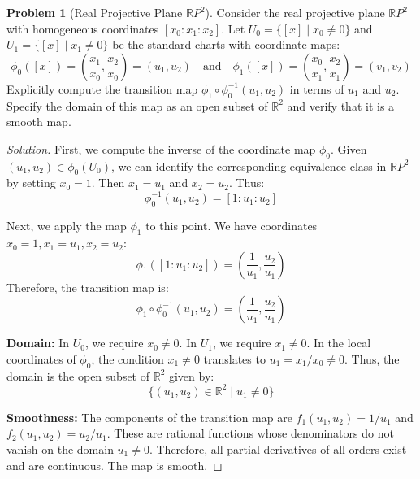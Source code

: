 \documentclass[12pt, a4paper]{article}
\theoremstyle{definition}
\newtheorem{problem}{Problem}
\newenvironment{solution}
  {\renewcommand\qedsymbol{$\blacksquare$}\begin{proof}[Solution]}
  {\end{proof}}
\newcommand{\RR}{\mathbb{R}}
\begin{document}
\begin{problem}[Real Projective Plane $\RR P^2$]
Consider the real projective plane $\RR P^2$ with homogeneous coordinates $[x_0 : x_1 : x_2]$. Let $U_0 = \{ [x] \mid x_0 \neq 0 \}$ and $U_1 = \{ [x] \mid x_1 \neq 0 \}$ be the standard charts with coordinate maps:
$$\phi_0([x]) = \left(\frac{x_1}{x_0}, \frac{x_2}{x_0}\right) = (u_1, u_2) \quad \text{and} \quad \phi_1([x]) = \left(\frac{x_0}{x_1}, \frac{x_2}{x_1}\right) = (v_1, v_2)$$
Explicitly compute the transition map $\phi_1 \circ \phi_0^{-1}(u_1, u_2)$ in terms of $u_1$ and $u_2$. Specify the domain of this map as an open subset of $\RR^2$ and verify that it is a smooth map.
\end{problem}
\begin{solution}
First, we compute the inverse of the coordinate map $\phi_0$. Given $(u_1, u_2) \in \phi_0(U_0)$, we can identify the corresponding equivalence class in $\RR P^2$ by setting $x_0 = 1$. Then $x_1 = u_1$ and $x_2 = u_2$. Thus:
\[
\phi_0^{-1}(u_1, u_2) = [1 : u_1 : u_2]
\]

Next, we apply the map $\phi_1$ to this point. We have coordinates $x_0 = 1, x_1 = u_1, x_2 = u_2$:
\[
\phi_1([1 : u_1 : u_2]) = \left( \frac{1}{u_1}, \frac{u_2}{u_1} \right)
\]
Therefore, the transition map is:
\[
\phi_1 \circ \phi_0^{-1}(u_1, u_2) = \left( \frac{1}{u_1}, \frac{u_2}{u_1} \right)
\]

\textbf{Domain:} In $U_0$, we require $x_0 \neq 0$. In $U_1$, we require $x_1 \neq 0$. In the local coordinates of $\phi_0$, the condition $x_1 \neq 0$ translates to $u_1 = x_1/x_0 \neq 0$. 
Thus, the domain is the open subset of $\RR^2$ given by:
\[
\{ (u_1, u_2) \in \RR^2 \mid u_1 \neq 0 \}
\]

\textbf{Smoothness:} The components of the transition map are $f_1(u_1, u_2) = 1/u_1$ and $f_2(u_1, u_2) = u_2/u_1$. These are rational functions whose denominators do not vanish on the domain $u_1 \neq 0$. Therefore, all partial derivatives of all orders exist and are continuous. The map is smooth.
\end{solution}

\vfill\newpage
\end{document}
